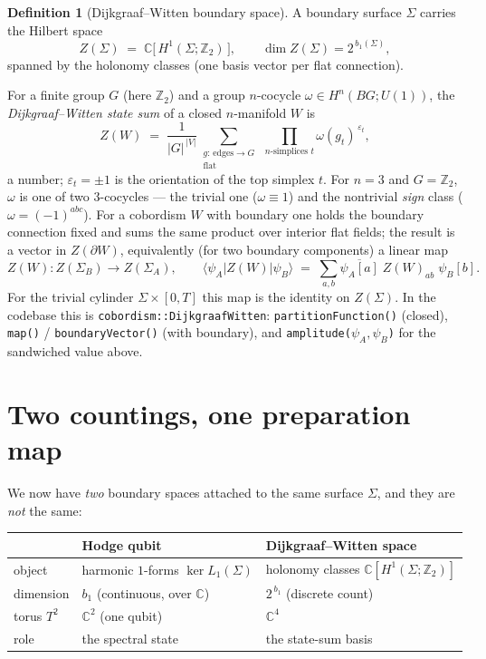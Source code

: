\documentclass[11pt]{article}
\theoremstyle{plain}
\theoremstyle{definition}
\newtheorem{definition}{Definition}
\theoremstyle{remark}
\newcommand{\C}{\mathbb{C}}
\newcommand{\Z}{\mathbb{Z}}
\newcommand{\ip}[3]{\langle #1 \vert #2 \vert #3 \rangle}
\begin{document}
\begin{definition}[Dijkgraaf--Witten boundary space]
A boundary surface $\Sigma$ carries the Hilbert space
\begin{equation}
Z(\Sigma) \;=\; \C\big[\,H^1(\Sigma;\Z_2)\,\big],
\qquad \dim Z(\Sigma) = 2^{\,b_1(\Sigma)},
\end{equation}
spanned by the holonomy classes (one basis vector per flat connection).
\end{definition}

For a finite group $G$ (here $\Z_2$) and a group $n$-cocycle
$\omega \in H^n(BG; U(1))$, the \emph{Dijkgraaf--Witten state sum} of a closed
$n$-manifold $W$ is
\begin{equation}
Z(W) \;=\; \frac{1}{\lvert G\rvert^{\,\lvert V\rvert}}
\sum_{\substack{g:\,\text{edges}\to G \\ \text{flat}}}
\ \prod_{\text{$n$-simplices } t} \omega(g_t)^{\,\varepsilon_t},
\end{equation}
a number; $\varepsilon_t=\pm1$ is the orientation of the top simplex $t$. For
$n=3$ and $G=\Z_2$, $\omega$ is one of two $3$-cocycles --- the trivial one
($\omega\equiv 1$) and the nontrivial \emph{sign} class
($\omega = (-1)^{abc}$). For a cobordism $W$ with boundary one holds the
boundary connection fixed and sums the same product over interior flat fields;
the result is a vector in $Z(\partial W)$, equivalently (for two boundary
components) a linear map
\begin{equation}
Z(W) : Z(\Sigma_B) \longrightarrow Z(\Sigma_A),
\qquad
\ip{\psi_A}{Z(W)}{\psi_B} \;=\;
\sum_{a,b} \overline{\psi_A[a]}\; Z(W)_{ab}\; \psi_B[b] .
\end{equation}
For the trivial cylinder $\Sigma\times[0,T]$ this map is the identity on
$Z(\Sigma)$. In the codebase this is \texttt{cobordism::DijkgraafWitten}:
\texttt{partitionFunction()} (closed), \texttt{map()} / \texttt{boundaryVector()}
(with boundary), and \texttt{amplitude(}$\psi_A,\psi_B$\texttt{)} for the
sandwiched value above.

\section{Two countings, one preparation map}\label{sec:counting}

We now have \emph{two} boundary spaces attached to the same surface $\Sigma$,
and they are \emph{not} the same:

\begin{center}
\begin{tabular}{@{}lll@{}}
\toprule
 & Hodge qubit & Dijkgraaf--Witten space \\
\midrule
object & harmonic $1$-forms $\ker L_1(\Sigma)$ & holonomy classes $\C[H^1(\Sigma;\Z_2)]$ \\
dimension & $b_1$ \;(continuous, over $\C$) & $2^{\,b_1}$ \;(discrete count) \\
torus $T^2$ & $\C^2$ \;(one qubit) & $\C^4$ \\
role & the spectral state & the state-sum basis \\
\bottomrule
\end{tabular}
\end{center}
\end{document}
